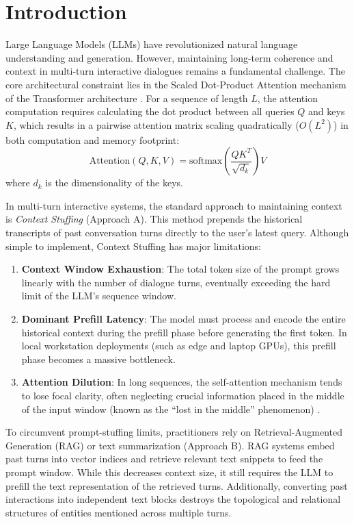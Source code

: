 \documentclass[conference]{IEEEtran}
\begin{document}
\section{Introduction}
Large Language Models (LLMs) have revolutionized natural language understanding and generation. However, maintaining long-term coherence and context in multi-turn interactive dialogues remains a fundamental challenge. The core architectural constraint lies in the Scaled Dot-Product Attention mechanism of the Transformer architecture \cite{vaswani2017attention}. For a sequence of length $L$, the attention computation requires calculating the dot product between all queries $Q$ and keys $K$, which results in a pairwise attention matrix scaling quadratically ($O(L^2)$) in both computation and memory footprint:
\begin{equation}
\text{Attention}(Q, K, V) = \text{softmax}\left(\frac{QK^T}{\sqrt{d_k}}\right)V
\end{equation}
where $d_k$ is the dimensionality of the keys.

In multi-turn interactive systems, the standard approach to maintaining context is \textit{Context Stuffing} (Approach A). This method prepends the historical transcripts of past conversation turns directly to the user's latest query. Although simple to implement, Context Stuffing has major limitations:
\begin{enumerate}
    \item \textbf{Context Window Exhaustion}: The total token size of the prompt grows linearly with the number of dialogue turns, eventually exceeding the hard limit of the LLM's sequence window.
    \item \textbf{Dominant Prefill Latency}: The model must process and encode the entire historical context during the prefill phase before generating the first token. In local workstation deployments (such as edge and laptop GPUs), this prefill phase becomes a massive bottleneck.
    \item \textbf{Attention Dilution}: In long sequences, the self-attention mechanism tends to lose focal clarity, often neglecting crucial information placed in the middle of the input window (known as the ``lost in the middle'' phenomenon) \cite{liu2024lost}.
\end{enumerate}

To circumvent prompt-stuffing limits, practitioners rely on Retrieval-Augmented Generation (RAG) or text summarization (Approach B). RAG systems embed past turns into vector indices and retrieve relevant text snippets to feed the prompt window. While this decreases context size, it still requires the LLM to prefill the text representation of the retrieved turns. Additionally, converting past interactions into independent text blocks destroys the topological and relational structures of entities mentioned across multiple turns.
\end{document}
